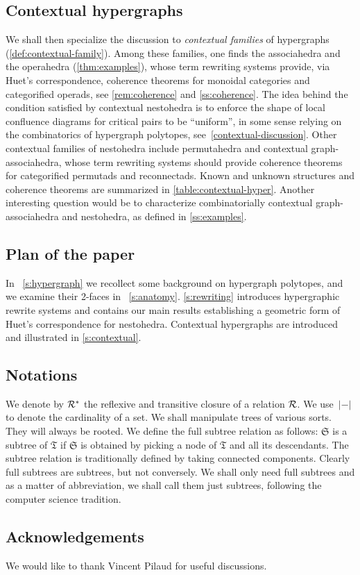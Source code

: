 \subsection*{Contextual hypergraphs}

We shall then specialize the discussion to \emph{contextual families} of hypergraphs (\cref{def:contextual-family}). 
Among these families, one finds the associahedra and the operahedra (\cref{thm:examples}), whose term rewriting systems provide, via Huet's correspondence, coherence theorems for monoidal categories and categorified operads, see \cref{rem:coherence} and \cref{ss:coherence}.  
The idea behind the condition satisfied by contextual nestohedra is to enforce the shape of local confluence diagrams for critical pairs to be ``uniform'', in some sense relying on the combinatorics of hypergraph polytopes, see~\cref{contextual-discussion}.
Other contextual families of nestohedra include permutahedra and contextual graph-associahedra, whose term rewriting systems should provide coherence theorems for categorified permutads and reconnectads.
Known and unknown structures and coherence theorems are summarized in \cref{table:contextual-hyper}.
Another interesting question would be to characterize combinatorially contextual graph-associahedra and nestohedra, as defined in \cref{ss:examples}. 

\subsection*{Plan of the paper}
In~ \cref{s:hypergraph} we recollect some background on hypergraph polytopes, and we examine their 2-faces in~ \cref{s:anatomy}.   \cref{s:rewriting} introduces hypergraphic rewrite systems and contains our main results establishing a geometric form of Huet's correspondence for nestohedra. 
Contextual hypergraphs are introduced and illustrated in  \cref{s:contextual}.

\subsection*{Notations}

We denote by ${\cal R}^*$ the reflexive and transitive closure of a relation ${\cal R}$. 
We use~$|-|$ to denote the cardinality of a set.
We shall manipulate trees of various sorts. They will always be rooted.  We define the  full subtree relation as follows: $\mathfrak{S}$
is a subtree of $\mathfrak{T}$ if $\mathfrak{S}$ is obtained by picking a node of $\mathfrak{T}$ and all its descendants. The subtree relation is traditionally defined by taking connected components. Clearly full subtrees are subtrees, but not conversely. We shall only need full subtrees and as a matter of abbreviation, we shall call them just subtrees, following the computer science tradition.

\subsection*{Acknowledgements}
We would like to thank Vincent Pilaud for useful discussions.

